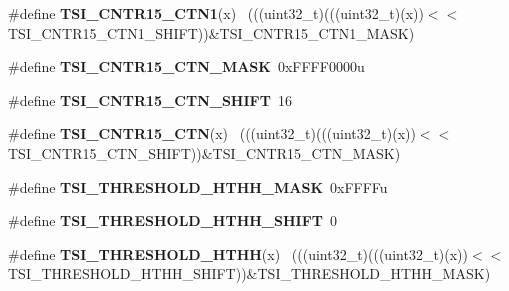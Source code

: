 \begin{DoxyCompactItemize}
\item 
\hypertarget{group___t_s_i___register___masks_ga9ec01214a1e4b6c4f0d7fe19718a32e1}{}\#define {\bfseries T\+S\+I\+\_\+\+C\+N\+T\+R15\+\_\+\+C\+T\+N1}(x)                                          ~(((uint32\+\_\+t)(((uint32\+\_\+t)(x))$<$$<$T\+S\+I\+\_\+\+C\+N\+T\+R15\+\_\+\+C\+T\+N1\+\_\+\+S\+H\+I\+F\+T))\&T\+S\+I\+\_\+\+C\+N\+T\+R15\+\_\+\+C\+T\+N1\+\_\+\+M\+A\+S\+K)\label{group___t_s_i___register___masks_ga9ec01214a1e4b6c4f0d7fe19718a32e1}

\item 
\hypertarget{group___t_s_i___register___masks_ga35c1646ad39bdaa79f196bf3feb17c57}{}\#define {\bfseries T\+S\+I\+\_\+\+C\+N\+T\+R15\+\_\+\+C\+T\+N\+\_\+\+M\+A\+S\+K}~0x\+F\+F\+F\+F0000u\label{group___t_s_i___register___masks_ga35c1646ad39bdaa79f196bf3feb17c57}

\item 
\hypertarget{group___t_s_i___register___masks_ga78cfe2a84b08fb470251a3f7b5ff4596}{}\#define {\bfseries T\+S\+I\+\_\+\+C\+N\+T\+R15\+\_\+\+C\+T\+N\+\_\+\+S\+H\+I\+F\+T}~16\label{group___t_s_i___register___masks_ga78cfe2a84b08fb470251a3f7b5ff4596}

\item 
\hypertarget{group___t_s_i___register___masks_gabdb8510f1ed62f131dccfc0a027a6ef8}{}\#define {\bfseries T\+S\+I\+\_\+\+C\+N\+T\+R15\+\_\+\+C\+T\+N}(x)                                            ~(((uint32\+\_\+t)(((uint32\+\_\+t)(x))$<$$<$T\+S\+I\+\_\+\+C\+N\+T\+R15\+\_\+\+C\+T\+N\+\_\+\+S\+H\+I\+F\+T))\&T\+S\+I\+\_\+\+C\+N\+T\+R15\+\_\+\+C\+T\+N\+\_\+\+M\+A\+S\+K)\label{group___t_s_i___register___masks_gabdb8510f1ed62f131dccfc0a027a6ef8}

\item 
\hypertarget{group___t_s_i___register___masks_ga16649a111791f8e88bb8c6862f5c0e5e}{}\#define {\bfseries T\+S\+I\+\_\+\+T\+H\+R\+E\+S\+H\+O\+L\+D\+\_\+\+H\+T\+H\+H\+\_\+\+M\+A\+S\+K}~0x\+F\+F\+F\+Fu\label{group___t_s_i___register___masks_ga16649a111791f8e88bb8c6862f5c0e5e}

\item 
\hypertarget{group___t_s_i___register___masks_ga0ee9b07bb7ed9477302f8a0c7f822ef5}{}\#define {\bfseries T\+S\+I\+\_\+\+T\+H\+R\+E\+S\+H\+O\+L\+D\+\_\+\+H\+T\+H\+H\+\_\+\+S\+H\+I\+F\+T}~0\label{group___t_s_i___register___masks_ga0ee9b07bb7ed9477302f8a0c7f822ef5}

\item 
\hypertarget{group___t_s_i___register___masks_gaeff11f0e851bc524a73e6600a8118e92}{}\#define {\bfseries T\+S\+I\+\_\+\+T\+H\+R\+E\+S\+H\+O\+L\+D\+\_\+\+H\+T\+H\+H}(x)                                    ~(((uint32\+\_\+t)(((uint32\+\_\+t)(x))$<$$<$T\+S\+I\+\_\+\+T\+H\+R\+E\+S\+H\+O\+L\+D\+\_\+\+H\+T\+H\+H\+\_\+\+S\+H\+I\+F\+T))\&T\+S\+I\+\_\+\+T\+H\+R\+E\+S\+H\+O\+L\+D\+\_\+\+H\+T\+H\+H\+\_\+\+M\+A\+S\+K)\label{group___t_s_i___register___masks_gaeff11f0e851bc524a73e6600a8118e92}


\end{DoxyCompactItemize}
